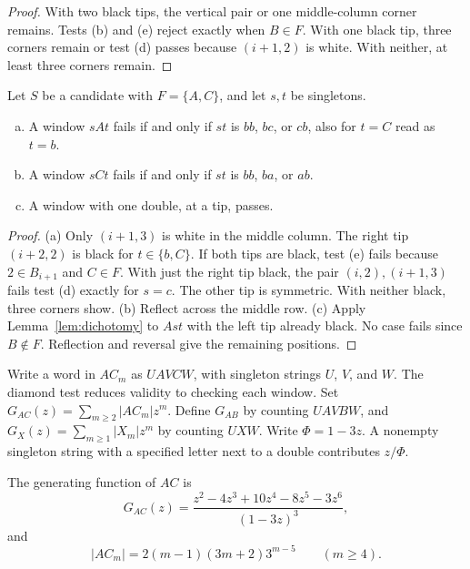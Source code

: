 \begin{proof}
With two black tips, the vertical pair or one middle-column corner
remains. Tests (b) and (e) reject exactly when $B\in F$.
With one black tip, three corners remain or test (d) passes because
$(i+1,2)$ is white. With neither, at least three corners remain.
\end{proof}

\begin{lemma}\label{lem:sixofnine}
Let $S$ be a candidate with $F=\{A,C\}$, and let $s,t$ be singletons.
\begin{enumerate}[(a)]
\item A window $sAt$ fails if and only if $st$ is $bb$, $bc$, or $cb$, also for $t=C$ read
as $t=b$.
\item A window $sCt$ fails if and only if $st$ is $bb$, $ba$, or $ab$.
\item A window with one double, at a tip, passes.
\end{enumerate}
\end{lemma}

\begin{proof}
(a) Only $(i+1,3)$ is white in the middle column.
The right tip $(i+2,2)$ is black for $t\in\{b,C\}$.
If both tips are black, test (e) fails because $2\in B_{i+1}$ and $C\in F$.
With just the right tip black, the pair $(i,2),(i+1,3)$ fails test (d)
exactly for $s=c$. The other tip is symmetric. With neither black,
three corners show. (b) Reflect across the middle row.
(c) Apply Lemma~\ref{lem:dichotomy} to $Ast$ with the left tip
already black. No case fails since $B\notin F$.
Reflection and reversal give the remaining positions.
\end{proof}

Write a word in $AC_m$ as $UAVCW$, with singleton strings $U$, $V$,
and $W$. The diamond test reduces validity to checking each window.
Set $G_{AC}(z)=\sum_{m\ge2}|AC_m|z^m$. Define $G_{AB}$ by counting
$UAVBW$, and $G_X(z)=\sum_{m\ge1}|X_m|z^m$ by counting $UXW$.
Write $\Phi=1-3z$. A nonempty singleton string with a specified letter
next to a double contributes $z/\Phi$.

\begin{proposition}\label{prop:threeGAC}
The generating function of $AC$ is
\begin{equation}\label{eq:GAC}
G_{AC}(z)=\frac{z^2-4z^3+10z^4-8z^5-3z^6}{(1-3z)^3},
\end{equation}
and
\begin{equation}\label{eq:GACcoef}
|AC_m|=2(m-1)(3m+2)3^{m-5}\qquad(m\ge4).
\end{equation}
\end{proposition}

